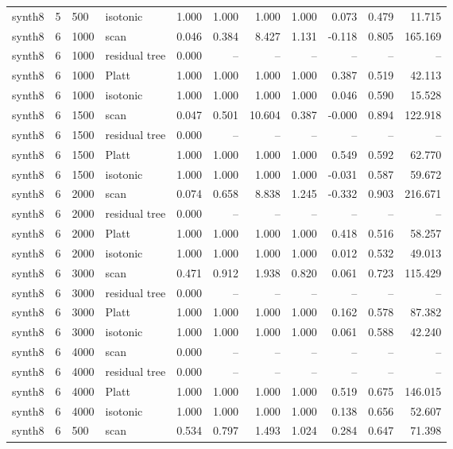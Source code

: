\begin{tabular}{lrllrrrrrrr}
synth8 & 5 & 500 & isotonic & 1.000 & 1.000 & 1.000 & 1.000 & 0.073 & 0.479 & 11.715 \\
synth8 & 6 & 1000 & scan & 0.046 & 0.384 & 8.427 & 1.131 & -0.118 & 0.805 & 165.169 \\
synth8 & 6 & 1000 & residual tree & 0.000 & -- & -- & -- & -- & -- & -- \\
synth8 & 6 & 1000 & Platt & 1.000 & 1.000 & 1.000 & 1.000 & 0.387 & 0.519 & 42.113 \\
synth8 & 6 & 1000 & isotonic & 1.000 & 1.000 & 1.000 & 1.000 & 0.046 & 0.590 & 15.528 \\
synth8 & 6 & 1500 & scan & 0.047 & 0.501 & 10.604 & 0.387 & -0.000 & 0.894 & 122.918 \\
synth8 & 6 & 1500 & residual tree & 0.000 & -- & -- & -- & -- & -- & -- \\
synth8 & 6 & 1500 & Platt & 1.000 & 1.000 & 1.000 & 1.000 & 0.549 & 0.592 & 62.770 \\
synth8 & 6 & 1500 & isotonic & 1.000 & 1.000 & 1.000 & 1.000 & -0.031 & 0.587 & 59.672 \\
synth8 & 6 & 2000 & scan & 0.074 & 0.658 & 8.838 & 1.245 & -0.332 & 0.903 & 216.671 \\
synth8 & 6 & 2000 & residual tree & 0.000 & -- & -- & -- & -- & -- & -- \\
synth8 & 6 & 2000 & Platt & 1.000 & 1.000 & 1.000 & 1.000 & 0.418 & 0.516 & 58.257 \\
synth8 & 6 & 2000 & isotonic & 1.000 & 1.000 & 1.000 & 1.000 & 0.012 & 0.532 & 49.013 \\
synth8 & 6 & 3000 & scan & 0.471 & 0.912 & 1.938 & 0.820 & 0.061 & 0.723 & 115.429 \\
synth8 & 6 & 3000 & residual tree & 0.000 & -- & -- & -- & -- & -- & -- \\
synth8 & 6 & 3000 & Platt & 1.000 & 1.000 & 1.000 & 1.000 & 0.162 & 0.578 & 87.382 \\
synth8 & 6 & 3000 & isotonic & 1.000 & 1.000 & 1.000 & 1.000 & 0.061 & 0.588 & 42.240 \\
synth8 & 6 & 4000 & scan & 0.000 & -- & -- & -- & -- & -- & -- \\
synth8 & 6 & 4000 & residual tree & 0.000 & -- & -- & -- & -- & -- & -- \\
synth8 & 6 & 4000 & Platt & 1.000 & 1.000 & 1.000 & 1.000 & 0.519 & 0.675 & 146.015 \\
synth8 & 6 & 4000 & isotonic & 1.000 & 1.000 & 1.000 & 1.000 & 0.138 & 0.656 & 52.607 \\
synth8 & 6 & 500 & scan & 0.534 & 0.797 & 1.493 & 1.024 & 0.284 & 0.647 & 71.398 \\

\end{tabular}
